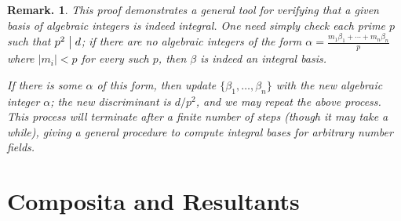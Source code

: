 \documentclass[11pt, a4paper]{memoir}
\renewcommand{\div}{\bigm|}
\theoremstyle{change}
\theoremstyle{plain}
\theoremstyle{nonumberplain}
\newtheorem{remark}{Remark.}
\numberwithin{equation}{section}
\begin{document}
\begin{remark}
    This proof demonstrates a general tool for verifying that a given basis of algebraic integers is indeed integral.
    One need simply check each prime $p$ such that $p^2\div d$; if there are no algebraic integers of the form $\alpha=\frac{m_1\beta_1+\cdots+m_n\beta_n}{p}$ where $|m_i|<p$ for every such $p$, then $\beta$ is indeed an integral basis.

    If there is some $\alpha$ of this form, then update $\{\beta_1,\ldots,\beta_n\}$ with the new algebraic integer $\alpha$; the new discriminant is $d/p^2$, and we may repeat the above process.
    This process will terminate after a finite number of steps (though it may take a while), giving a general procedure to compute integral bases for arbitrary number fields.
\end{remark}
\section{Composita and Resultants}
\end{document}
